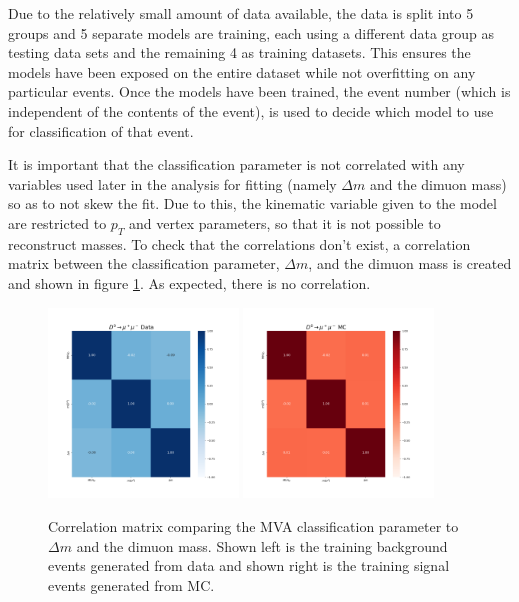 Due to the relatively small amount of data available, the data is split into 5 groups and 5 separate models are training, each using a different data group as testing data sets and the remaining 4 as training datasets. This ensures the models have been exposed on the entire dataset while not overfitting on any particular events. Once the models have been trained, the event number (which is independent of the contents of the event), is used to decide which model to use for classification of that event. 

It is important that the classification parameter is not correlated with any variables used later in the analysis for fitting (namely $\Delta m$ and the dimuon mass) so as to not skew the fit. Due to this, the kinematic variable given to the model are restricted to $p_T$ and vertex parameters, so that it is not possible to reconstruct masses. To check that the correlations don't exist, a correlation matrix between the classification parameter, $\Delta m$, and the dimuon mass is created and shown in figure \ref{fig:mva_correlation_matrix_for_fit_variables}. As expected, there is no correlation.


\begin{figure}[htp]
    \begin{center}
      \includegraphics[width=0.45\textwidth]{figures/chapter4/mva/Correlation_data_obs.png}
      \includegraphics[width=0.45\textwidth]{figures/chapter4/mva/Correlation_dmm_obs.png}\\
    \end{center}
    \caption{
      Correlation matrix comparing the MVA classification parameter to $\Delta m$ and the dimuon mass. Shown left is the training background events generated from data and shown right is the training signal events generated from MC.
    }
    \label{fig:mva_correlation_matrix_for_fit_variables}
\end{figure}

